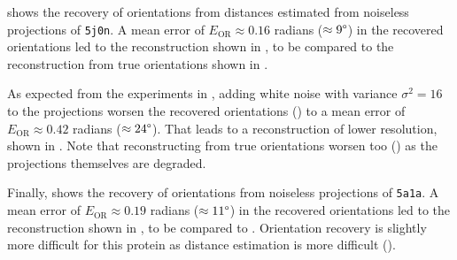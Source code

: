  shows the recovery of orientations from distances estimated from noiseless projections of \texttt{5j0n}.
A mean error of $E_\text{OR} \approx 0.16$ radians ($\approx 9\degree$) in the recovered orientations led to the reconstruction shown in , to be compared to the reconstruction from true orientations shown in .
 


As expected from the experiments in , adding white noise with variance $\sigma^2=16$ to the projections worsen the recovered orientations () to a mean error of $E_\text{OR} \approx 0.42$ radians ($\approx 24\degree$).
That leads to a reconstruction of lower resolution, shown in .
Note that reconstructing from true orientations worsen too  () as the projections themselves are degraded.

Finally,  shows the recovery of orientations from noiseless projections of \texttt{5a1a}.
A mean error of $E_\text{OR} \approx 0.19$ radians ($\approx 11\degree$) in the recovered orientations led to the reconstruction shown in , to be compared to .
Orientation recovery is slightly more difficult for this protein as distance estimation is more difficult ().

